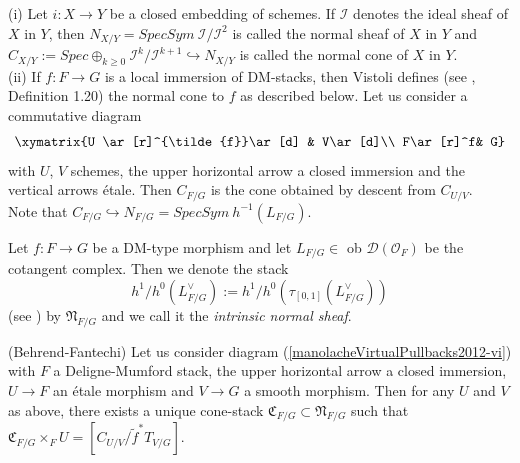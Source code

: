 \begin{example}\label{manolacheVirtualPullbacks2012-ex-2.11}
(i) Let $i:X\to Y$ be a closed embedding of schemes. If $\mathcal{I}$ denotes the ideal sheaf of $X$ in $Y$, then $N_{X/Y}=Spec Sym\ \mathcal{I}/\mathcal{I}^2$ is called the normal sheaf of $X$ in $Y$ and $C_{X/Y}:=Spec\oplus_{k\geq 0} \mathcal{I}^k/\mathcal{I}^{k+1}\hookrightarrow N_{X/Y}$ is called the normal cone of $X$ in $Y$.
\\(ii) If $f:F\to G$ is a local immersion of DM-stacks, then Vistoli defines (see \cite{v}, Definition 1.20) the normal cone to $f$ as described below. Let us consider a commutative diagram
\begin{equation}\label{manolacheVirtualPullbacks2012-vi}
 \xymatrix {U \ar[r]^{\tilde{f}}\ar[d] & V\ar[d]\\
             F\ar[r]^f& G}
\end{equation}
with $U$, $V$ schemes, the upper horizontal arrow a closed immersion and the vertical arrows \'{e}tale. Then $C_{F/G}$ is the cone obtained by descent from $C_{U/V}$.
\\Note that $C_{F/G}\hookrightarrow N_{F/G}=SpecSym\ h^{-1}(L_{F/G})$.
\end{example}

\begin{definition}\label{manolacheVirtualPullbacks2012-def-2.12}
\label{manolacheVirtualPullbacks2012-normsheaf}
 Let $f:F\to G$ be a DM-type morphism and let $L_{F/G}\in$ ob $\mathcal{D}(\mathcal{O}_{F})$ be the cotangent complex. Then we denote the stack $$h^1/h^0(L_{F/G}^{\vee}):=h^1/h^0(\tau_{[0,1]}(L_{F/G}^{\vee}))$$ (see \cite{bf}) by $\mathfrak{N}_{F/G}$ and we call it the \emph{intrinsic normal sheaf}.
\end{definition}

\begin{proposition}\label{manolacheVirtualPullbacks2012-prop-2.13}
(Behrend-Fantechi) Let us consider diagram (\ref{manolacheVirtualPullbacks2012-vi}) with $F$ a Deligne-Mumford stack, the upper horizontal arrow a closed immersion, $U\to F$ an \'{e}tale morphism and $V\to G$ a smooth morphism. Then for any $U$ and $V$ as above, there exists a unique cone-stack $\mathfrak{C}_{F/G}\subset\mathfrak{N}_{F/G}$ such that $\mathfrak{C}_{F/G}\times_FU=[C_{U/V}/\tilde{f}^*T_{V/G}]$.
\end{proposition}

